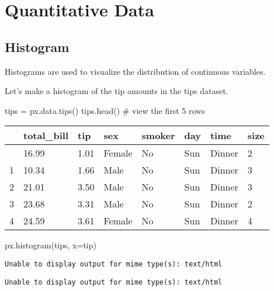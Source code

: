 \documentclass[
  letterpaper,
  DIV=11,
  numbers=noendperiod]{scrreprt}
\newenvironment{Shaded}{\begin{snugshade}}{\end{snugshade}}
\newcommand{\CommentTok}[1]{\textcolor[rgb]{0.37,0.37,0.37}{#1}}
\newcommand{\NormalTok}[1]{\textcolor[rgb]{0.00,0.23,0.31}{#1}}
\newcommand{\OperatorTok}[1]{\textcolor[rgb]{0.37,0.37,0.37}{#1}}
\newcommand{\StringTok}[1]{\textcolor[rgb]{0.13,0.47,0.30}{#1}}
\begin{document}
\section{Quantitative Data}\label{quantitative-data}

\subsection{Histogram}\label{histogram}

Histograms are used to visualize the distribution of continuous
variables.

Let's make a histogram of the tip amounts in the tips dataset.

\begin{Shaded}
\begin{Highlighting}[]
\NormalTok{tips }\OperatorTok{=}\NormalTok{ px.data.tips()}
\NormalTok{tips.head() }\CommentTok{\# view the first 5 rows}
\end{Highlighting}
\end{Shaded}

\begin{longtable}[]{@{}llllllll@{}}
\toprule\noalign{}
& total\_bill & tip & sex & smoker & day & time & size \\
\midrule\noalign{}
\endhead
\bottomrule\noalign{}
\endlastfoot
0 & 16.99 & 1.01 & Female & No & Sun & Dinner & 2 \\
1 & 10.34 & 1.66 & Male & No & Sun & Dinner & 3 \\
2 & 21.01 & 3.50 & Male & No & Sun & Dinner & 3 \\
3 & 23.68 & 3.31 & Male & No & Sun & Dinner & 2 \\
4 & 24.59 & 3.61 & Female & No & Sun & Dinner & 4 \\
\end{longtable}

\begin{Shaded}
\begin{Highlighting}[]
\NormalTok{px.histogram(tips, x}\OperatorTok{=}\StringTok{\textquotesingle{}tip\textquotesingle{}}\NormalTok{)}
\end{Highlighting}
\end{Shaded}

\begin{verbatim}
Unable to display output for mime type(s): text/html
\end{verbatim}

\begin{verbatim}
Unable to display output for mime type(s): text/html
\end{verbatim}
\end{document}
